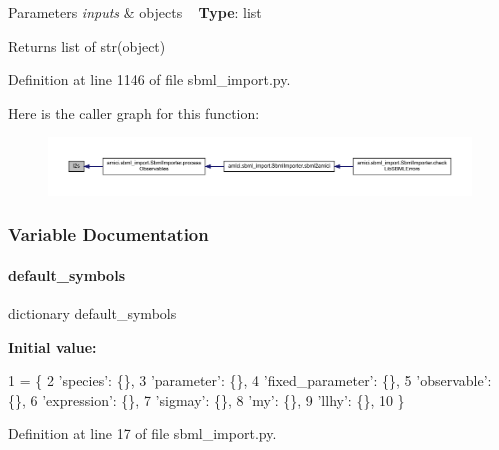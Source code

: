 \begin{DoxyParams}{Parameters}
{\em inputs} & objects ~\newline
{\bfseries Type}\+: list\\
\hline
\end{DoxyParams}
\begin{DoxyReturn}{Returns}
list of str(object) 
\end{DoxyReturn}


Definition at line 1146 of file sbml\+\_\+import.\+py.

Here is the caller graph for this function\+:
\nopagebreak
\begin{figure}[H]
\begin{center}
\leavevmode
\includegraphics[width=350pt]{namespaceamici_1_1sbml__import_a6bff3fedaa877c35e5ea7bc112ec4adf_icgraph}
\end{center}
\end{figure}


\subsubsection{Variable Documentation}
\mbox{\label{namespaceamici_1_1sbml__import_abfb00dffe8d5c524c2916febc9b3810b}} 
\paragraph{\texorpdfstring{default\+\_\+symbols}{default\_symbols}}
{\footnotesize\ttfamily dictionary default\+\_\+symbols}

{\bfseries Initial value\+:}
\begin{DoxyCode}
1 =  \{
2     \textcolor{stringliteral}{'species'}: \{\},
3     \textcolor{stringliteral}{'parameter'}: \{\},
4     \textcolor{stringliteral}{'fixed\_parameter'}: \{\},
5     \textcolor{stringliteral}{'observable'}: \{\},
6     \textcolor{stringliteral}{'expression'}: \{\},
7     \textcolor{stringliteral}{'sigmay'}: \{\},
8     \textcolor{stringliteral}{'my'}: \{\},
9     \textcolor{stringliteral}{'llhy'}: \{\},
10 \}
\end{DoxyCode}


Definition at line 17 of file sbml\+\_\+import.\+py.

